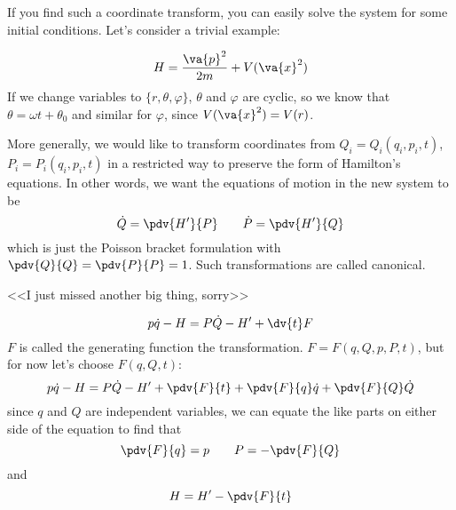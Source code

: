 \documentclass[a4paper,twoside,master.tex]{subfiles}
\begin{document}
If you find such a coordinate transform, you can easily solve the system for some initial conditions. Let's consider a trivial example:

\begin{ex}
    \begin{equation}
        H = \frac{\va{p}^2}{2m} + V(\va{x}^2)
    \end{equation}
    If we change variables to $ \{r, \theta, \varphi\} $, $ \theta $ and $ \varphi $ are cyclic, so we know that $ \theta = \omega t + \theta_0 $ and similar for $ \varphi $, since $ V(\va{x}^2) = V(r) $.
\end{ex}

More generally, we would like to transform coordinates from $ Q_i = Q_i(q_i,p_i,t) $, $ P_i = P_i(q_i, p_i, t) $ in a restricted way to preserve the form of Hamilton's equations. In other words, we want the equations of motion in the new system to be
\begin{equation}
    \dot{Q} = \pdv{H'}{P} \qquad \dot{P} = \pdv{H'}{Q}
\end{equation}
which is just the Poisson bracket formulation with $ \pdv{Q}{Q}= \pdv{P}{P}= 1 $. Such transformations are called canonical.

<<I just missed another big thing, sorry>>

\begin{equation}
    p \dot{q} - H = P\dot{Q} - H' + \dv{t}F
\end{equation}
$ F $ is called the generating function the transformation. $ F = F(q,Q,p,P,t) $, but for now let's choose $ F(q,Q,t) $:
\begin{equation}
    p\dot{q} - H = P\dot{Q} - H' + \pdv{F}{t} + \pdv{F}{q}\dot{q} + \pdv{F}{Q} \dot{Q}
\end{equation}
since $ q $ and $ Q $ are independent variables, we can equate the like parts on either side of the equation to find that
\begin{equation}
    \pdv{F}{q} = p \qquad P = - \pdv{F}{Q}
\end{equation}
and
\begin{equation}
    H = H' - \pdv{F}{t}
\end{equation}
\end{document}
